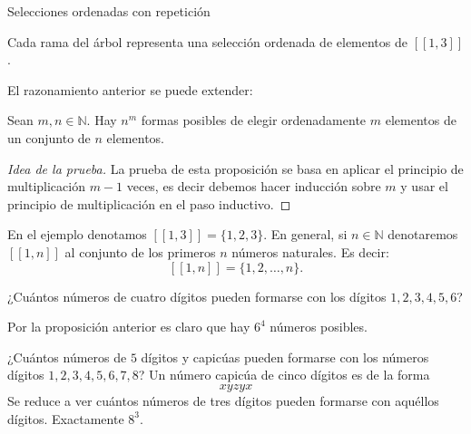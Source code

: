 \begin{section}{Selecciones ordenadas con repetición}
\begin{ejemplo*}



Cada rama del árbol representa una selección ordenada de elementos de $[[1, 3]]$.

\end{ejemplo*}

El razonamiento anterior  se puede extender:

\begin{proposicion}
Sean  $m,n \in \mathbb N$. Hay   $n^m$ formas posibles de elegir ordenadamente $m$ elementos de un conjunto de $n$ elementos.
\end{proposicion}
\begin{proof}[Idea de la prueba]
La prueba de esta proposición se basa en aplicar el principio de multiplicación $m-1$ veces, es decir debemos hacer inducción sobre $m$ y usar el principio de multiplicación en el paso inductivo. 
\end{proof}

\begin{observacion*} En el ejemplo denotamos $ [[ 1 , 3]] = \{ 1, 2, 3 \}$. En general, si  $n \in \mathbb N$ denotaremos  $[[ 1 , n]]$ al conjunto de los primeros $n$ números naturales. Es decir:
$$
 [[ 1 , n]] = \{ 1, 2, \ldots,n\}.
$$  
\end{observacion*}

\begin{ejemplo*}
¿Cuántos números de cuatro dígitos pueden formarse con
los dígitos $1, 2, 3, 4, 5, 6$?

Por la proposición anterior es claro que hay $6^4$ números posibles.
\end{ejemplo*}


\begin{ejemplo*}
¿Cuántos números de $5$ dígitos y capicúas pueden formarse
con los números dígitos $1, 2, 3, 4, 5, 6, 7, 8$? Un número
capicúa de cinco dígitos es de la forma
$$xyzyx$$
Se reduce a ver cuántos números de tres dígitos pueden
formarse con aquéllos dígitos.
Exactamente $8^3$.
\end{ejemplo*}




\end{section}
